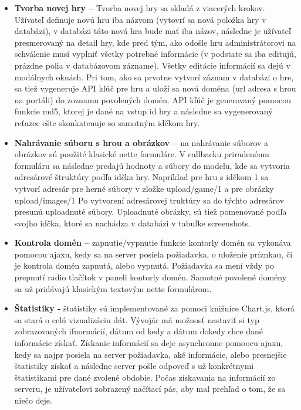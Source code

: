 \begin{itemize}  
\item \textbf{Tvorba novej hry –} Tvorba novej hry sa skladá z viacerých krokov. Užívateľ definuje novú hru iba názvom (vytovrí sa nová položka hry v databázi), v databázi táto nová hra bude mať iba názov, následne je užívateľ presmerovaný na detail hry, kde pred tým, ako odošle hru administrátorovi na schválenie musí vyplniť všetky potrebné informácie (v podstate sa iba editujú, prázdne polia v databázovom zázname). Všetky editácie informácií sa dejú v modálnych oknách. Pri tom, ako sa prvotne vytvorí záznam v databázi o hre, sa tiež vygeneruje API kľúč pre hru a uloží sa nová doména (url adresa s hrou na portáli) do zoznamu povolených domén. API kľúč je generovaný pomocou funkcie md5, ktorej je dané na vstup id hry a následne sa vygenerovaný reťazec ešte skonkatenuje so samotným idčkom hry. 
\item \textbf{Nahrávanie súboru s hrou a obrázkov –} na nahrávanie súborov a obrázkov sú použité klasické nette formuláre. V callbacku priradenému formuláru sa následne predajú hodnoty a súbory do modelu, kde sa vytvoria adresárové štruktúry podľa idčka hry. Napríklad pre hru s idčkom 1 sa vytvorí adresár pre herné súbory v zložke upload/game/1 a pre obrázky upload/images/1 Po vytvorení adresárovej truktúry sa do týchto adresárov presunú uploadnuté súbory. Uploadnuté obrázky, sú tiež pomenované podľa svojho idčka, ktoré sa nachádza v databázi v tabuľke screenshots.
\item \textbf{Kontrola domén –} zapnutie/vypnutie funkcie kontorly domén sa vykonáva pomocou ajaxu, kedy sa na server posiela požiadavka, o uloženie príznkau, či je kontrola domén zapnutá, alebo vypnutá. Požiadavka sa mení vždy po prepnutí radio tlačítok v paneli kontorly domén. Samotné povolené domény sa už pridávajú klasickým textovým nette formulárom. 
\item \textbf{Štatistiky -} štatistiky sú implementované za pomoci knižnice Chart.js, ktorá sa stará o celú vizualizáciu dát. Vývojár má možnosť nastaviť si typ zobrazovaných ifnormácií, dátum od kedy a dátum dokedy chce dané informácie získať. Získanie informácií sa deje asynchronne pomoocu ajaxu, kedy sa najpr posiela na server požiadavka, aké informácie, alebo presnejšie štatistiky získať a následne server pošle odpoveď s už konkrétnymi štatistikami pre dané zvolené obdobie. Počas získavania na informácií zo serveru, je užívateľovi zobrazený načítací pás, aby mal prehľad o tom, že sa niečo deje. 
\end{itemize} 

